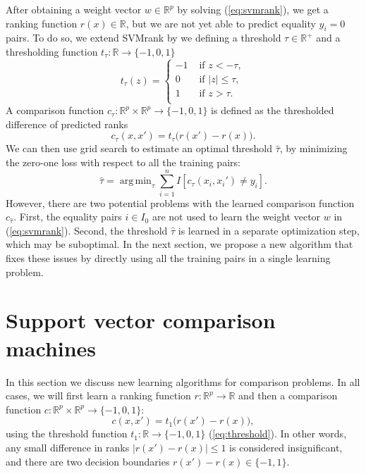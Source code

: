 \documentclass{article}
\newcommand{\RR}{\mathbb R}
\DeclareMathOperator*{\argmin}{arg\,min}
\begin{document}
After obtaining a weight vector $w\in\RR^p$ by solving
(\ref{eq:svmrank}), we get a ranking function $r(x)\in\RR$, but we are
not yet able to predict equality $y_i=0$ pairs. To do so, we extend
SVMrank by we defining a threshold $\tau\in\RR^+$ and a thresholding
function $t_\tau:\RR\rightarrow\{-1,0,1\}$
\begin{equation}
  \label{eq:threshold}
  t_\tau(z) = 
  \begin{cases}
    -1 & \text{ if } z < -\tau, \\
    0 & \text{ if } |z| \leq \tau, \\
    1 & \text{ if } z > \tau. \\
  \end{cases}
\end{equation}
A comparison function $c_\tau:\RR^p\times \RR^p\rightarrow \{-1, 0,
1\}$ is defined as the thresholded difference of predicted ranks
\begin{equation}
  \label{eq:svmrank_c_t}
  c_\tau(x, x') = 
  t_\tau\big(
  r(x') - r(x)
  \big).
\end{equation}
We can then use grid search to estimate an optimal threshold $\hat
\tau$, by minimizing the zero-one loss with respect to all the
training pairs:
\begin{equation}
  \hat \tau = \argmin_{\tau}
  \sum_{i=1}^n
  I\left[ c_\tau(x_i, x_i') \neq y_i \right].
\end{equation}
However, there are two potential problems with the learned comparison
function $c_{\hat\tau}$. First, the equality pairs $i\in I_0$ are not
used to learn the weight vector $w$ in (\ref{eq:svmrank}). Second, the
threshold $\hat \tau$ is learned in a separate optimization step,
which may be suboptimal. In the next section, we propose a new
algorithm that fixes these issues by directly using all the
training pairs in a single learning problem.
\section{Support vector comparison machines}
\label{sec:svm-compare}

In this section we discuss new learning algorithms for comparison
problems. In all cases, we will first learn a ranking function
$r:\RR^p\rightarrow\RR$ and then a comparison function $c:\RR^p\times
\RR^p\rightarrow\{-1,0,1\}$:
\begin{equation}
  \label{eq:compare_general}
  c(x,x')=t_1\big( r(x') - r(x) \big),
\end{equation}
using the threshold
function $t_1:\RR\rightarrow\{-1,0,1\}$ (\ref{eq:threshold}). 
In other
words, any small difference in ranks $|r(x')-r(x)|\leq 1$ is considered
insignificant, and there are two decision boundaries
$r(x')-r(x)\in\{-1,1\}$.
\end{document}
